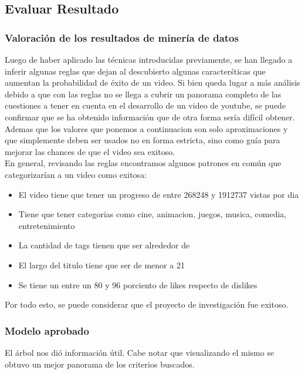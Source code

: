 \subsection{Evaluar Resultado}
    \subsubsection{Valoración de los resultados de minería de datos}

        Luego de haber aplicado las técnicas introducidas previamente, se han
        llegado a inferir algunas reglas que dejan al descubierto algunas
        caracterśticas que aumentan la probabilidad de éxito de un video.
        Si bien queda lugar a más análisis debido a que con las reglas no se
        llega a cubrir un panorama completo de las cuestiones a tener en cuenta
        en el desarrollo de un video de youtube, se puede confirmar que se ha
        obtenido información que de otra forma sería difícil obtener. Ademas
        que los valores que ponemos a continuacion son solo aproximaciones y
        que simplemente deben ser usados no en forma estricta, sino como guía
        para mejorar las chances de que el video sea exitoso.\\
        En general, revisando las reglas encontramos algunos patrones en común
        que categorizarían a un video como exitosa:
        \begin{itemize}
            \item El video tiene que tener un progreso de entre 268248 y 1912737 vistas por dia
            \item Tiene que tener categorias como cine, animacion, juegos, musica, comedia, entretenimiento
            \item La cantidad de tags tienen que ser alrededor de
            \item El largo del titulo tiene que ser de menor a 21
            \item Se tiene un entre un 80 y 96 porciento de likes respecto de dislikes
        \end{itemize}
        Por todo esto, se puede considerar que el proyecto de investigación fue
        exitoso.
    \subsubsection{Modelo aprobado}

        El árbol nos dió información útil. Cabe notar que visualizando el mismo
        se obtuvo un mejor panorama de los criterios buscados.


